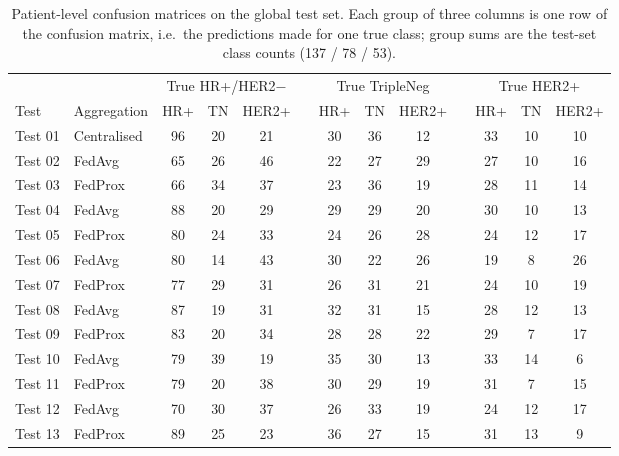 \begin{table}[htbp]
  \centering
  \caption[Confusion matrices]{Patient-level confusion matrices on the global test
    set. Each group of three columns is one row of the confusion matrix, i.e.\ the
    predictions made for one true class; group sums are the test-set class counts
    (137 / 78 / 53).}
  \label{tab:confusion_all}
  \small
  \begin{tabular}{ll ccc c ccc c ccc}
    \toprule
    & & \multicolumn{3}{c}{True HR+/HER2$-$} & & \multicolumn{3}{c}{True TripleNeg} &
    & \multicolumn{3}{c}{True HER2+} \\
    \cmidrule(lr){3-5}\cmidrule(lr){7-9}\cmidrule(l){11-13}
    Test & Aggregation & HR+ & TN & HER2+ & & HR+ & TN & HER2+ & & HR+ & TN & HER2+ \\
    \midrule
    Test 01 & Centralised & 96 & 20 & 21 & & 30 & 36 & 12 & & 33 & 10 & 10 \\
    Test 02 & FedAvg & 65 & 26 & 46 & & 22 & 27 & 29 & & 27 & 10 & 16 \\
    Test 03 & FedProx & 66 & 34 & 37 & & 23 & 36 & 19 & & 28 & 11 & 14 \\
    Test 04 & FedAvg & 88 & 20 & 29 & & 29 & 29 & 20 & & 30 & 10 & 13 \\
    Test 05 & FedProx & 80 & 24 & 33 & & 24 & 26 & 28 & & 24 & 12 & 17 \\
    Test 06 & FedAvg & 80 & 14 & 43 & & 30 & 22 & 26 & & 19 & 8 & 26 \\
    Test 07 & FedProx & 77 & 29 & 31 & & 26 & 31 & 21 & & 24 & 10 & 19 \\
    Test 08 & FedAvg & 87 & 19 & 31 & & 32 & 31 & 15 & & 28 & 12 & 13 \\
    Test 09 & FedProx & 83 & 20 & 34 & & 28 & 28 & 22 & & 29 & 7 & 17 \\
    Test 10 & FedAvg & 79 & 39 & 19 & & 35 & 30 & 13 & & 33 & 14 & 6 \\
    Test 11 & FedProx & 79 & 20 & 38 & & 30 & 29 & 19 & & 31 & 7 & 15 \\
    Test 12 & FedAvg & 70 & 30 & 37 & & 26 & 33 & 19 & & 24 & 12 & 17 \\
    Test 13 & FedProx & 89 & 25 & 23 & & 36 & 27 & 15 & & 31 & 13 & 9 \\
    \bottomrule
  \end{tabular}
\end{table}

